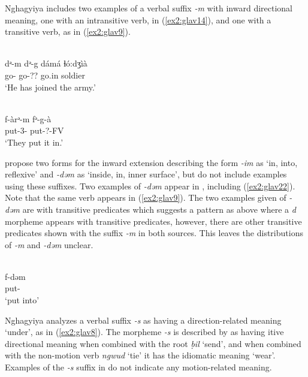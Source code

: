 Nghagyiya includes two examples of a verbal suffix \textit{-m} with inward directional meaning, one with an intransitive verb, in (\ref{ex2:glav14}), and one with a transitive verb, as in (\ref{ex2:glav9}).

\ea\label{ex2:glav14}
 \\
\gll dᵊ-m dᵊ-g dámá ɬó:dʒìà	\\
go- go-?? go.in soldier	\\
\glt `He has joined the army.'

\ex\label{ex2:glav9}
 \\
\gll f-àrᵊ-m	fᵊ-g-à \\
put-3-	put-?-FV \\
\glt `They put it in.'
\z 

\citet[663]{bubaGlavdaMorphology2007} propose two forms for the inward extension describing the form \textit{-im} as `in, into, reflexive' and \textit{-dəm} as `inside, in, inner surface', but do not include examples using these suffixes. Two examples of \textit{-dəm} appear in \citet{owensGlavdaRuralUrban2011}, including (\ref{ex2:glav22}). Note that the same verb appears in (\ref{ex2:glav9}). The two examples given of \textit{-dəm} are with transitive predicates which suggests a pattern as above where a \textit{d} morpheme appears with transitive predicates, however, there are other transitive predicates shown with the suffix \textit{-m} in both sources. This leaves the distributions of \textit{-m} and \textit{-dəm} unclear. 

\ea\label{ex2:glav22}
 \\
\gll f-dəm \\
put- \\
\glt `put into'
\z 

Nghagyiya analyzes a verbal suffix \textit{-s} as having a direction-related meaning `under', as in (\ref{ex2:glav8}). The morpheme \textit{-s} is described by \citet[126]{rappDictionaryGlavdaLanguage1968} as having itive directional meaning when combined with the root \textit{ḅil} ‘send’, and when combined with the non-motion verb \textit{ngwud} ‘tie’ it has the idiomatic meaning ‘wear’. Examples of the \textit{-s} suffix in \citet{owensGlavdaRuralUrban2011} do not indicate any motion-related meaning.

